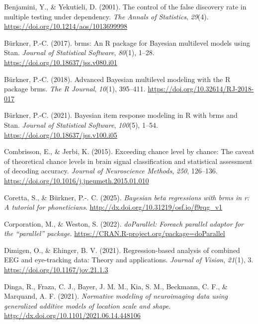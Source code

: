\documentclass[
  doc,
  floatsintext,
  longtable,
  a4paper,
  nolmodern,
  notxfonts,
  notimes,
  colorlinks=true,linkcolor=blue,citecolor=blue,urlcolor=blue]{apa7}
\newlength{\cslhangindent}
\newenvironment{CSLReferences}[2] %
 {\begin{list}{}{%
  \setlength{\itemindent}{0pt}
  \setlength{\leftmargin}{0pt}
  \setlength{\parsep}{0pt}
  \ifodd #1
   \setlength{\leftmargin}{\cslhangindent}
   \setlength{\itemindent}{-1\cslhangindent}
  \fi
  \setlength{\itemsep}{#2\baselineskip}}}
 {\end{list}}
\begin{document}
\begin{CSLReferences}{1}{0}
Benjamini, Y., \& Yekutieli, D. (2001). The control of the false
discovery rate in multiple testing under dependency. \emph{The Annals of
Statistics}, \emph{29}(4). \url{https://doi.org/10.1214/aos/1013699998}

Bürkner, P.-C. (2017). {brms}: An {R} package for {Bayesian} multilevel
models using {Stan}. \emph{Journal of Statistical Software},
\emph{80}(1), 1--28. \url{https://doi.org/10.18637/jss.v080.i01}

Bürkner, P.-C. (2018). Advanced {Bayesian} multilevel modeling with the
{R} package {brms}. \emph{The R Journal}, \emph{10}(1), 395--411.
\url{https://doi.org/10.32614/RJ-2018-017}

Bürkner, P.-C. (2021). Bayesian item response modeling in {R} with
{brms} and {Stan}. \emph{Journal of Statistical Software},
\emph{100}(5), 1--54. \url{https://doi.org/10.18637/jss.v100.i05}

Combrisson, E., \& Jerbi, K. (2015). Exceeding chance level by chance:
{The} caveat of theoretical chance levels in brain signal classification
and statistical assessment of decoding accuracy. \emph{Journal of
Neuroscience Methods}, \emph{250}, 126--136.
\url{https://doi.org/10.1016/j.jneumeth.2015.01.010}

Coretta, S., \& Bürkner, P.-. C. (2025). \emph{Bayesian beta regressions
with brms in r: A tutorial for phoneticians}.
\url{http://dx.doi.org/10.31219/osf.io/f9rqg_v1}

Corporation, M., \& Weston, S. (2022). \emph{{doParallel}: Foreach
parallel adaptor for the {``{parallel}''} package}.
\url{https://CRAN.R-project.org/package=doParallel}

Dimigen, O., \& Ehinger, B. V. (2021). Regression-based analysis of
combined EEG and eye-tracking data: Theory and applications.
\emph{Journal of Vision}, \emph{21}(1), 3.
\url{https://doi.org/10.1167/jov.21.1.3}

Dinga, R., Fraza, C. J., Bayer, J. M. M., Kia, S. M., Beckmann, C. F.,
\& Marquand, A. F. (2021). \emph{Normative modeling of neuroimaging data
using generalized additive models of location scale and shape}.
\url{http://dx.doi.org/10.1101/2021.06.14.448106}


\end{CSLReferences}
\end{document}
